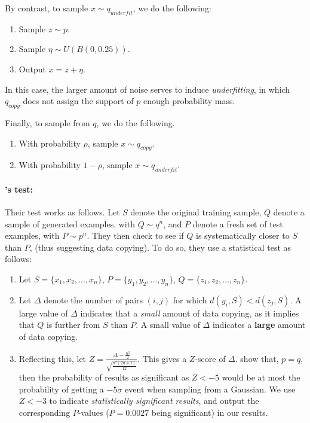 By contrast, to sample $x \sim q_{underfit}$, we do the following:
\begin{enumerate}
	\item Sample $z \sim p$.
	\item Sample $\eta \sim U(B(0, 0.25))$.
	\item Output $x = z + \eta$.
\end{enumerate}
In this case, the larger amount of noise serves to induce \textit{underfitting}, in which $q_{copy}$ does not assign the support of $p$ enough probability mass. 

Finally, to sample from $q$, we do the following.
\begin{enumerate}
	\item With probability $\rho$, sample $x \sim q_{copy}$.
	\item With probability $1 - \rho$, sample $x \sim q_{underfit}$. 
\end{enumerate}

\paragraph{\cite{MCD2020}'s test:} Their test works as follows. Let $S$ denote the original training sample, $Q$ denote a sample of generated examples, with $Q \sim q^{n}$, and $P$ denote a fresh set of test examples, with $P \sim p^n$. They then check to see if $Q$ is systematically closer to $S$ than $P$, (thus suggesting data copying). To do so, they use a statistical test as follows:
\begin{enumerate}
	\item Let $S = \{x_1, x_2, \dots, x_n\}$, $P = \{y_1, y_2, \dots, y_n\}$, $Q = \{z_1, z_2, \dots, z_n\}$. 
	\item Let $\Delta$ denote the number of pairs $(i, j)$ for which $d(y_i, S) < d(z_j, S)$. A large value of $\Delta$ indicates that a \textit{small} amount of data copying, as it implies that $Q$ is further from $S$ than $P$. A small value of $\Delta$ indicates a \textbf{large} amount of data copying.
	\item Reflecting this, let $Z = \frac{\Delta - \frac{n^2}{2}}{\sqrt{\frac{n^2(2n+1)}{12}}}$. This gives a $Z$-score of $\Delta$. \cite{MCD2020} show that, $p = q$, then the probability of results as significant as $Z < -5$ would be at most the probability of getting a $-5\sigma$ event when sampling from a Gaussian. We use $Z < -3$ to indicate \textit{statistically significant results}, and output the corresponding $P$-values ($P =  0.0027$ being significant) in our results. 
\end{enumerate}

